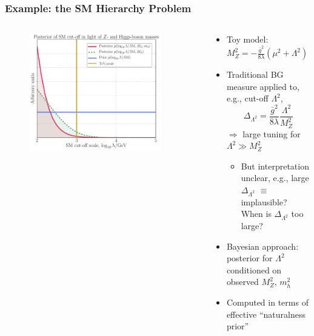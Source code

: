 \documentclass[10pt,aspectratio=169]{beamer}
\begin{document}
\begin{frame}
  \frametitle{Example: the SM Hierarchy Problem}
  \begin{columns}[t]
    \begin{column}{0.5\textwidth}
      \begin{figure}
        \includegraphics[width=0.9\textwidth]{SM_Lambda}
      \end{figure}
    \end{column}
    \begin{column}{0.5\textwidth}
      \begin{itemize} \itemsep1em
      \item Toy model: $M_Z^2 = -\frac{\bar{g}^2}{8 \lambda} (\mu^2
        + \Lambda^2)$
      \item Traditional BG measure applied to, e.g., cut-off $\Lambda^2$,
        \begin{equation*}
          \Delta_{\Lambda^2} = \frac{\bar{g}^2}{8 \lambda}
          \frac{\Lambda^2}{M_Z^2}
        \end{equation*}
        $\Rightarrow$ large tuning for $\Lambda^2 \gg M_Z^2$
        \begin{itemize}
        \item But interpretation unclear, e.g., large $\Delta_{\Lambda^2}$
          $\equiv$ implausible? When is $\Delta_{\Lambda^2}$ too large?
        \end{itemize}
      \item Bayesian approach: posterior for $\Lambda^2$ conditioned on
        observed $M_Z^2$, $m_h^2$
      \item Computed in terms of effective ``naturalness prior''
      \end{itemize}
    \end{column}
  \end{columns}
\end{frame}
\end{document}
